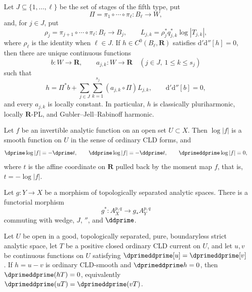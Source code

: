 \begin{theorem}
Let $J\subseteq\{1,\ldots,\ell\}$ be the set of stages of the fifth
type, put
\[
 \Pi=\pi_1\circ\cdots\circ\pi_\ell:B_\ell\longrightarrow W,
\]
and, for $j\in J$, put
\[
 \rho_j=\pi_{j+1}\circ\cdots\circ\pi_\ell:B_\ell\longrightarrow B_j,
 \qquad
 L_{j,k}=\rho_j^*q_{j,k}^*\log|T_{j,k}|,
\]
where $\rho_\ell$ is the identity when $\ell\in J$.  If
$h\in C^0(B_\ell,\mathbf R)$ satisfies
$\mathrm d'\mathrm d''[h]=0$, then there are unique continuous functions
\[
 b:W\to\mathbf R,
 \qquad a_{j,k}:W\to\mathbf R\quad(j\in J,\ 1\leq k\leq s_j)
\]
such that
\[
 h=\Pi^*b+
   \sum_{j\in J}\sum_{k=1}^{s_j}(a_{j,k}\circ\Pi)L_{j,k},
 \qquad \mathrm d'\mathrm d''[b]=0,
\]
and every $a_{j,k}$ is locally constant.  In particular, $h$ is
classically pluriharmonic, locally $\mathbf R$-PL, and
Gubler--Jell--Rabinoff harmonic.
\end{theorem}

\begin{lemma}
\label{lem:ch15-log-smooth}
Let $f$ be an invertible analytic function on an open set $U\subset X$.
Then $\log|f|$ is a smooth function on $U$ in the sense of ordinary CLD
forms, and
\[
 \dprime\log|f|=-\dprime t,\qquad
 \ddprime\log|f|=-\ddprime t,\qquad
 \dprimeddprime\log|f|=0,
\]
where $t$ is the affine coordinate on $\mathbf R$ pulled back by the moment
map $f$, that is, $t=-\log|f|$.
\end{lemma}

\begin{proposition}
\label{prop:cld-form-pullback}
Let $g:Y\to X$ be a morphism of topologically separated analytic spaces.
There is a functorial morphism
\[
                 g^*:A_X^{p,q}\longrightarrow g_*A_Y^{p,q}
\]
commuting with wedge, $J$, $\dprime$, and $\ddprime$.
\end{proposition}

\begin{corollary}
\label{cor:ch16-smooth-h}
Let $U$ be open in a good, topologically separated, pure, boundaryless
strict analytic space, let $T$ be a positive closed ordinary CLD current on
$U$, and let $u,v$ be continuous functions on $U$ satisfying
$\dprimeddprime[u]=\dprimeddprime[v]$.  If $h=u-v$ is ordinary CLD-smooth
and $\dprimeddprime h=0$, then
$\dprimeddprime(hT)=0$, equivalently
$\dprimeddprime(uT)=\dprimeddprime(vT)$.
\end{corollary}

